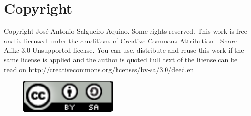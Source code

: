 \chapter{Copyright}
Copyright  Jos\'e Antonio Salgueiro Aquino. 
Some rights reserved. This work is free and is licensed under the conditions of Creative Commons Attribution 
- Share Alike 3.0 
Unsupported license. You can use, distribute and reuse this work if the same license is applied and the author is quoted
Full text of the license can be read on http://creativecommons.org/licenses/by-sa/3.0/deed.en
\begin{figure}
  \begin{center}
    \includegraphics[scale=1.00 ]{creative-commons}
  \end{center}
\end{figure}


